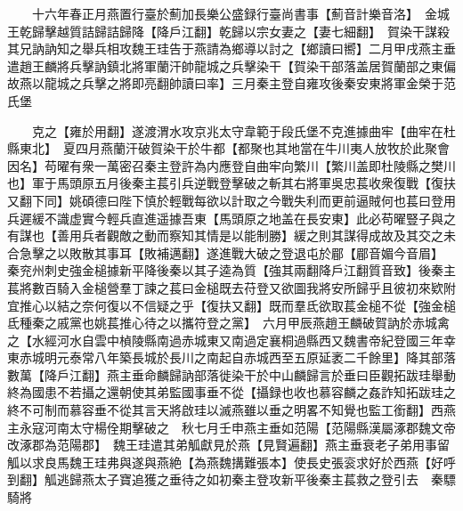 　　十六年春正月燕置行臺於薊加長樂公盛録行臺尚書事【薊音計樂音洛】　金城王乾歸擊越質詰歸詰歸降【降戶江翻】乾歸以宗女妻之【妻七細翻】　賀染干謀殺其兄訥訥知之舉兵相攻魏王珪告于燕請為鄉導以討之【鄉讀曰嚮】二月甲戌燕主垂遣趙王麟將兵擊訥鎮北將軍蘭汗帥龍城之兵擊染干【賀染干部落盖居賀蘭部之東偏故燕以龍城之兵擊之將即亮翻帥讀曰率】三月秦主登自雍攻後秦安東將軍金榮于范氏堡

　　克之【雍於用翻】遂渡渭水攻京兆太守韋範于段氏堡不克進據曲牢【曲牢在杜縣東北】　夏四月燕蘭汗破賀染干於牛都【都聚也其地當在牛川夷人放牧於此聚會因名】苟曜有衆一萬密召秦主登許為内應登自曲牢向繁川【繁川盖即杜陵縣之樊川也】軍于馬頭原五月後秦主萇引兵逆戰登擊破之斬其右將軍吳忠萇收衆復戰【復扶又翻下同】姚碩德曰陛下慎於輕戰每欲以計取之今戰失利而更前逼賊何也萇曰登用兵遲緩不識虚實今輕兵直進遥據吾東【馬頭原之地盖在長安東】此必苟曜豎子與之有謀也【善用兵者觀敵之動而察知其情是以能制勝】緩之則其謀得成故及其交之未合急擊之以敗散其事耳【敗補邁翻】遂進戰大破之登退屯於郿【郿音媚今音眉】　秦兖州刺史強金槌據新平降後秦以其子逵為質【強其兩翻降戶江翻質音致】後秦主萇將數百騎入金槌營羣丁諫之萇曰金槌既去苻登又欲圖我將安所歸乎且彼初來欵附宜推心以結之奈何復以不信疑之乎【復扶又翻】既而羣氐欲取萇金槌不從【強金槌氐種秦之戚黨也姚萇推心待之以攜符登之黨】　六月甲辰燕趙王麟破賀訥於赤城禽之【水經河水自雲中楨陵縣南過赤城東又南過定襄桐過縣西又魏書帝紀登國三年幸東赤城明元泰常八年築長城於長川之南起自赤城西至五原延袤二千餘里】降其部落數萬【降戶江翻】燕主垂命麟歸訥部落徙染干於中山麟歸言於垂曰臣觀拓跋珪舉動終為國患不若攝之還朝使其弟監國事垂不從【攝録也收也慕容麟之姦詐知拓跋珪之終不可制而慕容垂不從其言天將啟珪以滅燕雖以垂之明畧不知覺也監工銜翻】西燕主永寇河南太守楊佺期擊破之　秋七月壬申燕主垂如范陽【范陽縣漢屬涿郡魏文帝改涿郡為范陽郡】　魏王珪遣其弟觚獻見於燕【見賢遍翻】燕主垂衰老子弟用事留觚以求良馬魏王珪弗與遂與燕絶【為燕魏搆難張本】使長史張衮求好於西燕【好呼到翻】觚逃歸燕太子寶追獲之垂待之如初秦主登攻新平後秦主萇救之登引去　秦驃騎將

